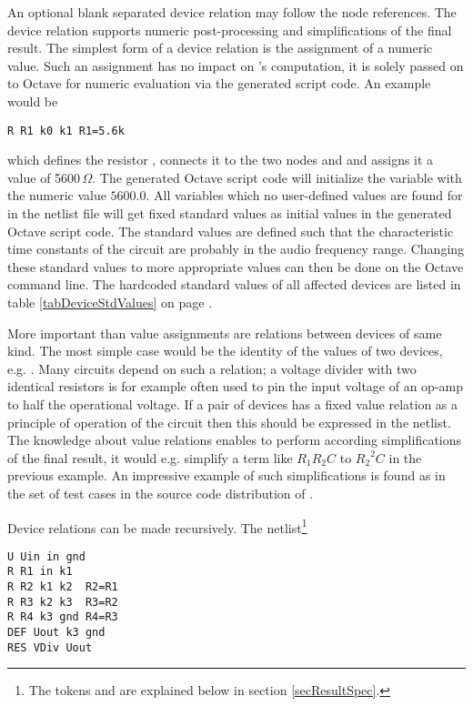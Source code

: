 An optional blank separated device relation may follow the node
references. The device relation supports numeric post-processing and
simplifications of the final result. The simplest form of a device
relation is the assignment of a numeric value. Such an assignment has no
impact on \linnet's computation, it is solely passed on to Octave for
numeric evaluation via the generated script code. An example would be

\begin{verbatim}
R R1 k0 k1 R1=5.6k
\end{verbatim}

\noindent
which defines the resistor , connects it to the two nodes
 and  and assigns it a value of 5600\,$\Omega$. The
generated Octave script code will initialize the variable  with
the numeric value $5600.0$. All variables which no user-defined values are
found for in the netlist file will get fixed standard values as initial
values in the generated Octave script code. The standard values are
defined such that the characteristic time constants of the circuit are
probably in the audio frequency range. Changing these standard values to
more appropriate values can then be done on the Octave command line. The
hardcoded standard values of all affected devices are listed in table
\ref{tabDeviceStdValues} on page \pageref{tabDeviceStdValues}.

More important than value assignments are relations between devices of
same kind. The most simple case would be the identity of the values of two
devices, e.g. . Many circuits depend on such a relation; a
voltage divider with two identical resistors is for example often used to
pin the input voltage of an op-amp to half the operational voltage. If a
pair of devices has a fixed value relation as a principle of operation of
the circuit then this should be expressed in the netlist. The knowledge
about value relations enables \linnet{} to perform according
simplifications of the final result, it would e.g. simplify a term like
$R_1 R_2 C$ to ${R_2}^2 C$ in the previous example. An impressive example
of such simplifications is found as  in the set of test
cases in the source code distribution of \linnet{}.

Device relations can be made recursively. The netlist\footnote{The tokens
 and  are explained below in section
\ref{secResultSpec}.}

\begin{verbatim}
U Uin in gnd
R R1 in k1
R R2 k1 k2  R2=R1
R R3 k2 k3  R3=R2
R R4 k3 gnd R4=R3
DEF Uout k3 gnd
RES VDiv Uout
\end{verbatim}

